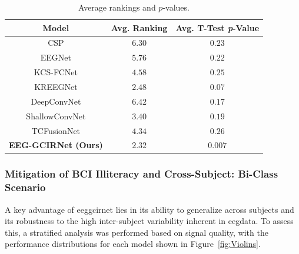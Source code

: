 \begin{table}[htbp]%
    \centering
    \caption{Average rankings and $p$-values.}
    \begin{tabularx}{\textwidth}{CCC}
       \toprule
        \textbf{Model} & \textbf{Avg. Ranking} & \textbf{Avg. T-Test \emph{p}-Value} \\
        \midrule
        CSP & $6.30$ & $0.23$ \\
        EEGNet & $5.76$ & $0.22$ \\
        KCS-FCNet & $4.58$ & $0.25$ \\
        KREEGNet & $2.48$ & $0.07$ \\
        DeepConvNet & $6.42$ & $0.17$ \\
        ShallowConvNet & $3.40$ & $0.19$ \\
        TCFusionNet & $4.34$ & $0.26$ \\
        \textbf{EEG-GCIRNet (Ours)} & $\mathbf{2.32}$ & $\mathbf{0.007}$ \\
        \bottomrule
    \end{tabularx}
    \label{tab:p-values_updated}
\end{table}
\subsubsection{Mitigation of BCI Illiteracy and Cross-Subject: Bi-Class Scenario}

A key advantage of \gls{eeggcirnet} lies in its ability to generalize across subjects and its robustness to the high inter-subject variability inherent in \gls{eeg}data. To assess this, a stratified analysis was performed based on signal quality, with the performance distributions for each model shown in Figure~\ref{fig:Violins}.


